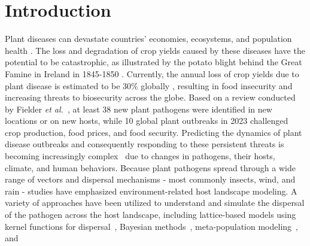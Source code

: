 \documentclass[aps,physrev,reprint,superscriptaddress]{revtex4-1}
\begin{document}

\maketitle

\section{Introduction}



Plant diseases can devastate countries' economies, ecosystems, and population health \cite{laine2023plant, al2017impact, chaves2025, Liebhold2012plantimp, Epanchin2017, Brasier2008uk}. The loss and degradation of crop yields caused by these diseases have the potential to be catastrophic, as illustrated by the potato blight behind the Great Famine in Ireland in 1845-1850 \cite{al2017impact}. Currently, the annual loss of crop yields due to plant disease is estimated to be 30\% globally \cite{gai2024plant}, resulting in food insecurity and increasing threats to biosecurity across the globe.     
Based on a review conducted by Fielder \textit{et al.}~\cite{fielder2024synoptic}, at least 38 new plant pathogens were identified in new locations or on new hosts, while 10 global plant outbreaks in 2023 challenged crop production, food prices, and food security. 
Predicting the dynamics of plant disease outbreaks and consequently responding to these persistent threats is becoming increasingly complex~\cite{laine2023plant} due to changes in pathogens, their hosts, climate, and human behaviors. Because plant pathogens spread through a wide range of vectors and dispersal mechanisms - most commonly insects, wind, and rain - studies have emphasized environment-related host landscape modeling. A variety of approaches have been utilized to understand and simulate the dispersal of the pathogen across the host landscape, including lattice-based models using kernel functions for dispersal~\cite{yuen2015landscape, cendoya_individual-based_2024,orozco2019early,landry_spatio-temporal_2021,signes-pont_epidemic_2020,white2017modelling,severns2022dispersal,chapman2025modelling,suprunenko2025predicting}, Bayesian methods~\cite{adrakey2023bayesian,varghese2020estimating}, meta-population modeling~\cite{severns2022dispersal,rimbaud2018using}, and 
\end{document}
